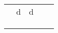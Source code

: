 


\begin{table}[]
  \centering
  \begin{tabular}{lllll}
  \cline{1-4}
  \multicolumn{1}{|l|}{} & \multicolumn{1}{c|}{d} & \multicolumn{1}{c|}{d} & \multicolumn{1}{l|}{} &  \\ \cline{1-4}
  \multicolumn{1}{|l|}{} & \multicolumn{1}{l|}{}  & \multicolumn{1}{l|}{}  & \multicolumn{1}{l|}{} &  \\ \cline{1-4}
  \multicolumn{1}{|l|}{} & \multicolumn{1}{l|}{}  & \multicolumn{1}{l|}{}  & \multicolumn{1}{l|}{} &  \\ \cline{1-4}
                         &                        &                        &                       & 
  \end{tabular}
  \end{table}
